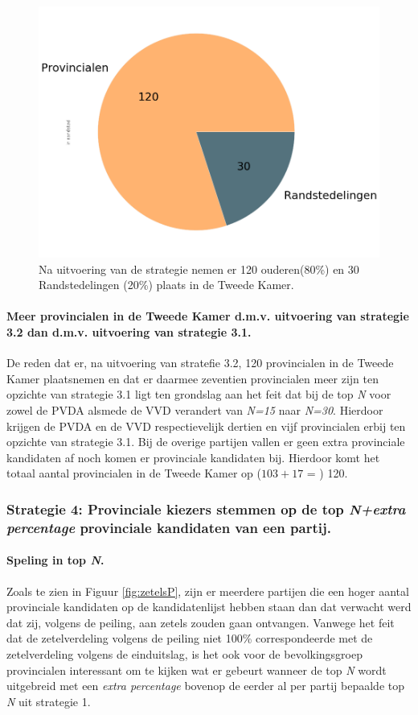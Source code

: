 \begin{figure}[H]
\centering
	\includegraphics[width=0.45\linewidth]{pie_chart_eigenX_provincialen.png}

\caption{Na uitvoering van de strategie nemen er 120 ouderen(80\%) en 30 Randstedelingen (20\%) plaats in de Tweede Kamer.}

\label{fig:pcS32P}
\end{figure}

\paragraph{Meer provincialen in de Tweede Kamer d.m.v. uitvoering van strategie 3.2 dan d.m.v. uitvoering van strategie 3.1.}
De reden dat er, na uitvoering van stratefie 3.2, 120 provincialen in de Tweede Kamer plaatsnemen en dat er daarmee zeventien provincialen meer zijn ten opzichte van strategie 3.1 ligt ten grondslag aan het feit dat bij de top \textit{N} voor zowel de PVDA alsmede de VVD verandert van \textit{N=15} naar \textit{N=30}. Hierdoor krijgen de PVDA en de VVD respectievelijk dertien en vijf provincialen erbij ten opzichte van strategie 3.1. Bij de overige partijen vallen er geen extra provinciale kandidaten af noch komen er provinciale kandidaten bij. Hierdoor komt het totaal aantal provincialen in de Tweede Kamer op ($103+17$ = ) 120.

\subsubsection{Strategie 4: Provinciale kiezers stemmen op de top \textit{N+extra percentage} provinciale kandidaten van een partij.}
\label{S4P}

\paragraph{Speling in top \textit{N}.}
Zoals te zien in Figuur \ref{fig:zetelsP}, zijn er meerdere partijen die een hoger aantal provinciale kandidaten op de kandidatenlijst hebben staan dan dat verwacht werd dat zij, volgens de peiling, aan zetels zouden gaan ontvangen. Vanwege het feit dat de zetelverdeling volgens de peiling niet 100\% correspondeerde met de zetelverdeling volgens de einduitslag, is het ook voor de bevolkingsgroep provincialen interessant om te kijken wat er gebeurt wanneer de top \textit{N} wordt uitgebreid met een \textit{extra percentage} bovenop de eerder al per partij bepaalde top \textit{N} uit strategie 1.



